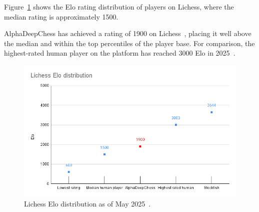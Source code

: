 \noindent Figure~\cref{fig:eloDistribution} shows the Elo rating distribution of players on Lichess, where the median rating is approximately 1500.

\vspace{1em}

\noindent AlphaDeepChess has achieved a rating of 1900 on Lichess~\cite{AlphaDeepChessElo}, placing it well above the median and within the top percentiles of the player base. For comparison, the highest-rated human player on the platform has reached 3000 Elo in 2025~\cite{LichessBestPlayer}.

\begin{figure}
    \centering
    \includegraphics[width=0.95\linewidth]{Imagenes/eloDistribution.png}
    \caption{Lichess Elo distribution as of May 2025~\cite{LichessEloDistribution}.}
    \label{fig:eloDistribution}
\end{figure}